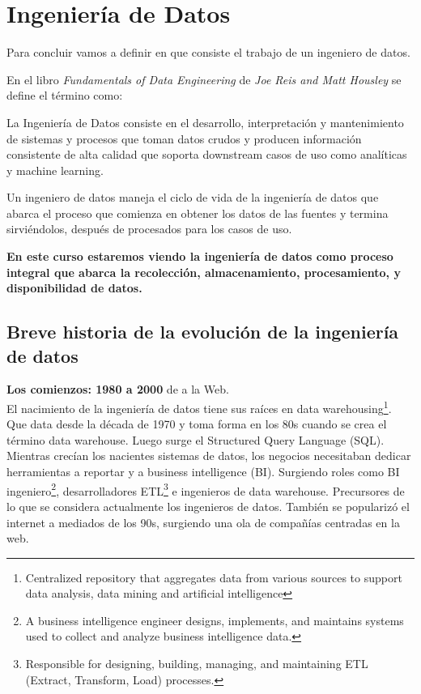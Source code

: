 \documentclass[12pt]{book}
\begin{document}
\section{Ingeniería de Datos}

Para concluir vamos a definir en que consiste el trabajo de un ingeniero de datos. 

En el libro \textit{Fundamentals of Data Engineering} de \textit{Joe Reis and Matt Housley} se define el término como:

La Ingeniería de Datos consiste en el desarrollo, interpretación y mantenimiento de sistemas y procesos que toman datos crudos y producen información consistente de alta calidad que soporta downstream casos de uso como analíticas y machine learning.

Un ingeniero de datos maneja el ciclo de vida de la ingeniería de datos que abarca el proceso que comienza en obtener los datos de las fuentes y termina sirviéndolos, después de procesados para los casos de uso.

\textbf{En este curso estaremos viendo la ingeniería de datos como proceso integral que abarca la recolección, almacenamiento, procesamiento, y disponibilidad de datos.}\\

\subsection{Breve historia de la evolución de la ingeniería de datos}
\textbf{Los comienzos: 1980 a 2000} de  a la Web.\\
El nacimiento de la ingeniería de datos tiene sus raíces en data warehousing\footnote{Centralized repository that aggregates data from various sources to support data analysis, data mining and artificial intelligence}.\\
Que data desde la década de 1970 y toma forma en los 80s cuando se crea el término data warehouse. Luego surge el Structured Query Language (SQL).
Mientras crecían los nacientes sistemas de datos, los negocios necesitaban dedicar herramientas a reportar y a business intelligence (BI). 
Surgiendo roles como BI ingeniero\footnote{A business intelligence engineer designs, implements, and maintains systems used to collect and analyze business intelligence data.}, desarrolladores ETL\footnote{Responsible for designing, building, managing, and maintaining ETL (Extract, Transform, Load) processes.} e ingenieros de data warehouse.
Precursores de lo que se considera actualmente los ingenieros de datos. También se popularizó el internet a mediados de los 90s, surgiendo una ola de compañías centradas en la web.
\end{document}
